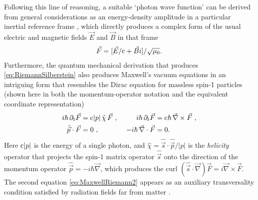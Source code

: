 \documentclass[1p,sort&compress]{elsarticle}
\numberwithin{equation}{section}
\newcommand{\rv}[1]{\vec{#1}}
\newcommand{\cc}{{\rm c}}
\begin{document}
Following this line of reasoning, a suitable `photon wave function' can be derived from general considerations as an energy-density amplitude in a particular inertial reference frame \cite{Bialynicki-Birula1994,Bialynicki-Birula1996,Gersten2001,Smith2006}, which directly produces a complex form of the usual electric and magnetic fields $\rv{E}$ and $\rv{B}$ in that frame
\begin{align}\label{eq:RiemannSilberstein}
  \rv{F} = [\rv{E}/\cc + \rv{B}i]/\sqrt{\mu_0}.
\end{align}
Furthermore, the quantum mechanical derivation that produces \eqref{eq:RiemannSilberstein} also produces Maxwell's vacuum equations in an intriguing form that resembles the Dirac equation for massless spin-1 particles \cite{Laporte1931,Oppenheimer1931,Mignani1974,Archibald1955,Good1957,Giannetto1985,Fushchich1987,Berry1990,Bialynicki-Birula1994,Bialynicki-Birula1996,Sipe1995,Esposito1998,Stepanovsky1998,Kobe1999,Gersten2001,Smith2006,Smith2007,Dragoman2007,Tamburini2008,Thide2011,
Barnett2014,Thide2014} (shown here in both the momentum-operator notation and the equivalent coordinate representation) 
\begin{subequations}\label{eq:MaxwellRiemann}
\begin{align}
  i\hbar\, \partial_t \rv{F} &= \cc|p|\,\hat{\chi}\,\rv{F}~, & i\hbar\, \partial_t \rv{F} &= \cc \hbar\, \rv{\nabla}\times\rv{F}~, \\
 \label{eq:MaxwellRiemann2}
 \hat{\rv{p}}\cdot\rv{F} &= 0~, &~ -i\hbar\,\rv{\nabla}\cdot\rv{F} &= 0.
\end{align}
\end{subequations}
Here $\cc|p|$ is the energy of a single photon, and $\hat{\chi} = \hat{\rv{s}}\cdot\hat{\rv{p}}/|p|$ is the \emph{helicity} operator that projects the spin-1 matrix operator $\hat{\rv{s}}$ onto the direction of the momentum operator $\hat{\rv{p}} = -i\hbar\rv{\nabla}$, which produces the curl $(\hat{\rv{s}}\cdot\rv{\nabla})\rv{F} = i\rv{\nabla}\times\rv{F}$. The second equation \eqref{eq:MaxwellRiemann2} appears as an auxiliary transversality condition satisfied by radiation fields far from matter \cite{Cohen1997,Keller2005}. 
\end{document}
